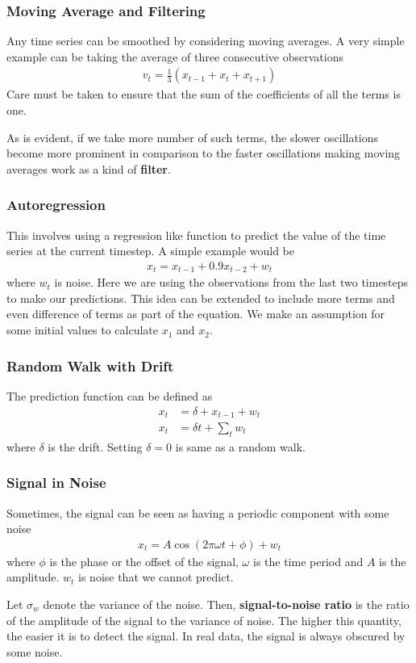 \documentclass[../main.tex]{subfiles}
\begin{document}
    \subsubsection{Moving Average and Filtering}
    Any time series can be smoothed by considering moving averages. A very simple example can be taking the average of three consecutive observations
    \begin{align*}
        v_{t} = \frac{1}{3}(x_{t-1} + x_{t} + x_{t+1})
    \end{align*}
    Care must be taken to ensure that the sum of the coefficients of all the terms is one.\newline

    As is evident, if we take more number of such terms, the slower oscillations become more prominent in comparison to the faster oscillations making moving averages work as a kind of \textbf{filter}.

    \subsubsection{Autoregression}
    This involves using a regression like function to predict the value of the time series at the current timestep. A simple example would be
    \begin{align*}
        x_{t} = x_{t-1} + 0.9x_{t-2} + w_{t}
    \end{align*}
    where $w_{t}$ is noise. Here we are using the observations from the last two timesteps to make our predictions. This idea can be extended to include more terms and even difference of terms as part of the equation. We make an assumption for some initial values to calculate $x_{1}$ and $x_{2}$.

    \subsubsection{Random Walk with Drift}
    The prediction function can be defined as
    \begin{align*}
        x_{t} &= \delta + x_{t-1} + w_{t}\\
        x_{t} &= \delta t + \sum_{t} w_{t}
    \end{align*}
    where $\delta$ is the drift. Setting $\delta = 0$ is same as a random walk.

    \subsubsection{Signal in Noise}
    Sometimes, the signal can be seen as having a periodic component with some noise
    \begin{align*}
        x_{t} = A\cos (2\pi \omega t + \phi) + w_{t}
    \end{align*}
    where $\phi$ is the phase or the offset of the signal, $\omega$ is the time period and $A$ is the amplitude. $w_{t}$ is noise that we cannot predict.\newline

    Let $\sigma_{w}$ denote the variance of the noise. Then, \textbf{signal-to-noise ratio} is the ratio of the amplitude of the signal to the variance of noise. The higher this quantity, the easier it is to detect the signal. In real data, the signal is always obscured by some noise.
    
\end{document}
